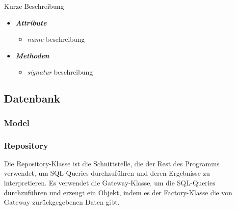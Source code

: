 \documentclass[a4paper,12pt]{article}
\begin{document}
Kurze Beschreibung

\begin{itemize}[label={}]

	\item \textit{\textbf{Attribute}}
		\begin{itemize}[label={\textbullet}]
			\item \textit{name} beschreibung
		\end{itemize}

	\item \textit{\textbf{Methoden}}
		\begin{itemize}[label={\textbullet}]
			\item \textit{signatur} beschreibung
		\end{itemize}


\end{itemize}

\fi

\subsection{Datenbank}
\subsubsection{Model}

\subsubsection{Repository}

Die Repository-Klasse ist die Schnittstelle, die der Rest des Programms verwendet, um SQL-Queries durchzuführen und deren Ergebnisse zu interpretieren. Es verwendet die Gateway-Klasse, um die SQL-Queries durchzuführen und erzeugt ein Objekt, indem es der Factory-Klasse die von Gateway zurückgegebenen Daten gibt.
\end{document}
